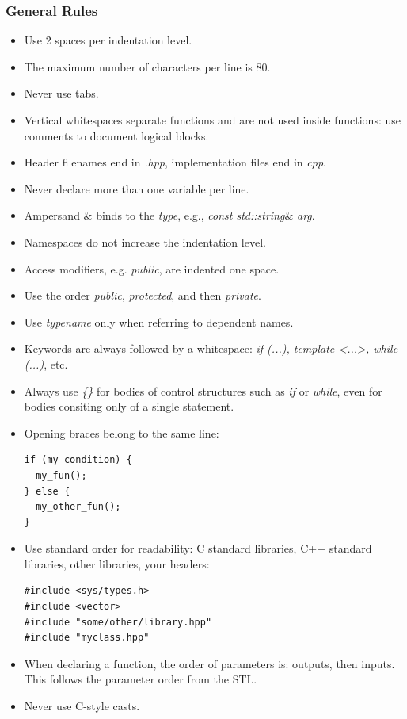 \documentclass[oneside,a4paper,titlepage]{scrartcl}              %
\begin{document}
\subsubsection{General Rules}
\begin{itemize}
  \item Use 2 spaces per indentation level.
  \item The maximum number of characters per line is 80.
  \item Never use tabs.
  \item Vertical whitespaces separate functions and are not used inside functions: use comments to document logical blocks.
  \item Header filenames end in \emph{.hpp}, implementation files end in \emph{cpp}.
  \item Never declare more than one variable per line.
  \item Ampersand {\&} binds to the \emph{type}, e.g., \emph{const std::string}\& \emph{arg}.
  \item Namespaces do not increase the indentation level.
  \item Access modifiers, e.g. \emph{public}, are indented one space.
  \item Use the order \emph{public}, \emph{protected}, and then \emph{private}.
  \item Use \emph{typename} only when referring to dependent names.
  \item Keywords are always followed by a whitespace: \emph{if (...), template \textless...\textgreater, while (...)}, etc.
  \item Always use \emph{\{\}} for bodies of control structures such as \emph{if} or \emph{while}, even for bodies consiting only of a single statement.
  \item Opening braces belong to the same line:
  \begin{lstlisting}
if (my_condition) {
  my_fun();
} else {
  my_other_fun();
}
  \end{lstlisting}
  \item Use standard order for readability: C standard libraries, C++ standard libraries, other libraries, your headers:
  \begin{lstlisting}
#include <sys/types.h>
#include <vector>
#include "some/other/library.hpp"
#include "myclass.hpp"
  \end{lstlisting}
  \item When declaring a function, the order of parameters is: outputs, then inputs. This follows the parameter order from the STL.
  \item Never use C-style casts.
\end{itemize}
\end{document}
